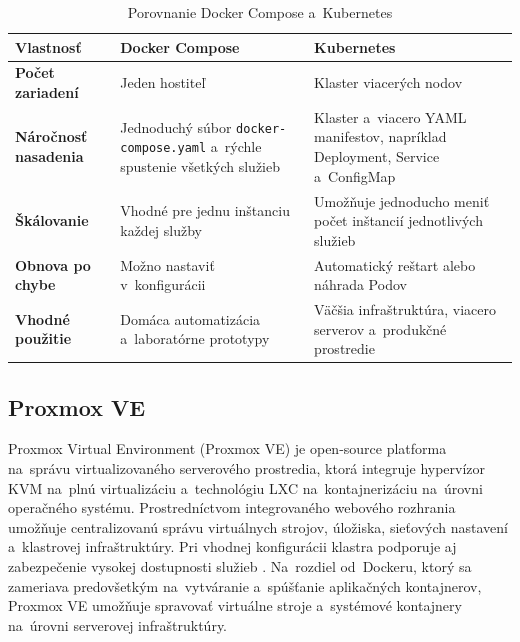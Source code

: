 \begin{table}[ht]
\centering
\small
\renewcommand{\arraystretch}{1.2}
\begin{tabularx}{\textwidth}{@{}
  >{\raggedright\arraybackslash}p{}
  >{\raggedright\arraybackslash}X
  >{\raggedright\arraybackslash}X
@{}}
  \toprule
  \textbf{Vlastnosť} & \textbf{Docker Compose} & \textbf{Kubernetes} \\
  \midrule
  \textbf{Počet zariadení} & Jeden hostiteľ & Klaster viacerých nodov\\
  \textbf{Náročnosť nasadenia} &
    Jednoduchý súbor \verb|docker-compose.yaml| a~rýchle spustenie všetkých služieb &
    Klaster a~viacero YAML manifestov, napríklad Deployment, Service a~ConfigMap\\
  \textbf{Škálovanie} &
    Vhodné pre jednu inštanciu každej služby &
    Umožňuje jednoducho meniť počet inštancií jednotlivých služieb\\
  \textbf{Obnova po chybe} &
    Možno nastaviť v~konfigurácii &
    Automatický reštart alebo náhrada Podov\\
  \textbf{Vhodné použitie} &
    Domáca automatizácia a~laboratórne prototypy &
    Väčšia infraštruktúra, viacero serverov a~produkčné prostredie\\
  \bottomrule
\end{tabularx}
\caption{Porovnanie Docker Compose a~Kubernetes}
\end{table}

\subsection{Proxmox VE}
Proxmox Virtual Environment (Proxmox VE) je open-source platforma na~správu 
virtualizovaného serverového prostredia, ktorá integruje hypervízor KVM na~plnú 
virtualizáciu a~technológiu LXC na~kontajnerizáciu na~úrovni operačného systému. 
Prostredníctvom integrovaného webového rozhrania umožňuje centralizovanú správu 
virtuálnych strojov, úložiska, sieťových nastavení a~klastrovej infraštruktúry. 
Pri vhodnej konfigurácii klastra podporuje aj zabezpečenie vysokej dostupnosti 
služieb \cite{proxmox}. Na~rozdiel od~Dockeru, ktorý sa zameriava predovšetkým 
na~vytváranie a~spúšťanie aplikačných kontajnerov, Proxmox VE umožňuje spravovať 
virtuálne stroje a~systémové kontajnery na~úrovni serverovej infraštruktúry.

